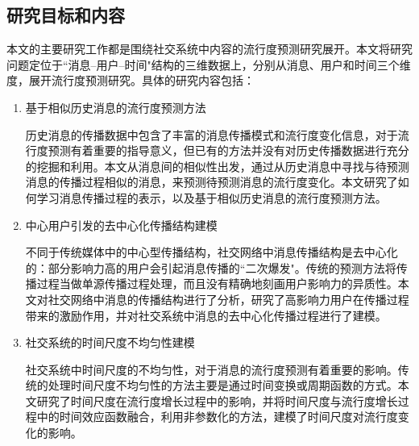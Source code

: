 \subsection{研究目标和内容}
本文的主要研究工作都是围绕社交系统中内容的流行度预测研究展开。本文将研究问题定位于``消息--用户--时间"结构的三维数据上，分别从消息、用户和时间三个维度，展开流行度预测研究。具体的研究内容包括：
\begin{enumerate}
\item 基于相似历史消息的流行度预测方法

历史消息的传播数据中包含了丰富的消息传播模式和流行度变化信息，对于流行度预测有着重要的指导意义，但已有的方法并没有对历史传播数据进行充分的挖掘和利用。本文从消息间的相似性出发，通过从历史消息中寻找与待预测消息的传播过程相似的消息，来预测待预测消息的流行度变化。本文研究了如何学习消息传播过程的表示，以及基于相似历史消息的流行度预测方法。
\item 中心用户引发的去中心化传播结构建模

不同于传统媒体中的中心型传播结构，社交网络中消息传播结构是去中心化的：部分影响力高的用户会引起消息传播的``二次爆发"。传统的预测方法将传播过程当做单源传播过程处理，而且没有精确地刻画用户影响力的异质性。本文对社交网络中消息的传播结构进行了分析，研究了高影响力用户在传播过程带来的激励作用，并对社交系统中消息的去中心化传播过程进行了建模。
\item 社交系统的时间尺度不均匀性建模

社交系统中时间尺度的不均匀性，对于消息的流行度预测有着重要的影响。传统的处理时间尺度不均匀性的方法主要是通过时间变换或周期函数的方式。本文研究了时间尺度在流行度增长过程中的影响，并将时间尺度与流行度增长过程中的时间效应函数融合，利用非参数化的方法，建模了时间尺度对流行度变化的影响。
\end{enumerate}
